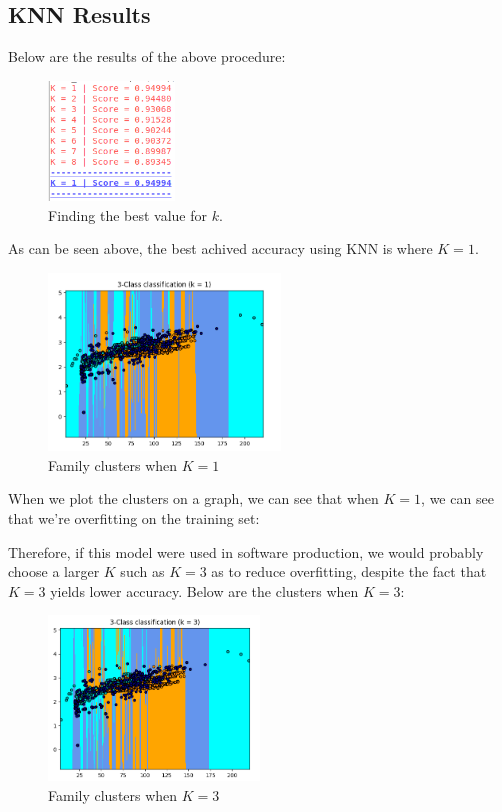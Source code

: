 \documentclass[12pt]{article}
\begin{document}
  \subsection{KNN Results}
  Below are the results of the above procedure:

          \begin{figure}[H]
          \centering
          \includegraphics[width=0.3\textwidth]{knn.png}
          \caption{Finding the best value for $k$.}
          \end{figure}
 
  As can be seen above, the best achived accuracy using KNN is where $K=1$.
  
          \begin{figure}[H]
          \centering
          \includegraphics[width=0.55\textwidth]{k1.png}
          \caption{Family clusters when $K=1$}
          \end{figure}
 
  When we plot the clusters on a graph, we can see that when $K = 1$, we can see that we're overfitting on the training set:


  Therefore, if this model were used in software production, we would probably choose a larger $K$ such as $K=3$ as to reduce overfitting, despite the fact that $K=3$ yields lower accuracy. Below are the clusters when $K=3$:
          \begin{figure}[H]
          \centering
          \includegraphics[width=0.5\textwidth]{k3.png}
          \caption{Family clusters when $K=3$}
          \end{figure}
\end{document}
